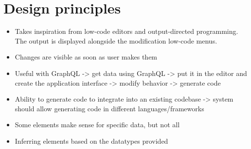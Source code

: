 \chapter{Design principles}
\label{chap:design}
\begin{itemize}
	\item Takes inspiration from low-code editors and output-directed programming. The output is displayed alongside the modification low-code menus.
	\item Changes are visible as soon as user makes them
	\item Useful with GraphQL -> get data using GraphQL -> put it in the editor and create the application interface -> modify behavior -> generate code
	\item Ability to generate code to integrate into an existing codebase -> system should allow generating code in different languages/frameworks
	\item Some elements make sense for specific data, but not all
	\item Inferring elements based on the datatypes provided
\end{itemize}


